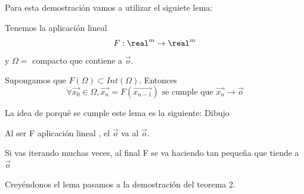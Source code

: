 Para esta demostración vamos a utilizar el siguiete lema:
\begin{lemma}
	Tenemos la aplicación lineal
	$$F: \real^m \rightarrow \real^m$$
	y $\Omega = $ compacto que contiene a $\overrightarrow o$.

	Supongamos que $F(\Omega) \subset Int(\Omega)$. Entonces
	$$\forall \overrightarrow{x_0} \in \Omega , \overrightarrow{x_n} = F(\overrightarrow{x_{n-1}}) \text{ se cumple que } \overrightarrow{x_n} \rightarrow \overrightarrow o$$
\end{lemma}

La idea de porqué se cumple este lema es la siguiente:
Dibujo

Al ser F aplicación lineal , el $\overrightarrow o$ va al $\overrightarrow o$.

Si vas iterando muchas veces, al final F se va haciendo tan pequeña que tiende a $\overrightarrow o$

Creyéndonos el lema pasamos a la demostración del teorema 2.

